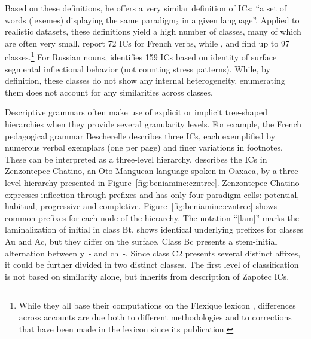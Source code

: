 \documentclass[output=paper]{langscibook}
\begin{document}
    Based on these definitions, he offers a very similar definition of ICs: ``a set of words (lexemes) displaying the same paradigm$_{2}$ in a given language''. Applied to realistic datasets, these definitions yield a high number of classes, many of which are often very small. \citet{StumpFinkel2013} report 72 ICs for French verbs, while \citet{Bonamihdr}, \citet{BeniamineBonamiSagot2017} and \citet{BeniaminePhd} find up to 97 classes.\footnote{While they all base their computations on the Flexique lexicon \citep{BonamiCaronPlancq2014}, differences across accounts are due both to different methodologies and to corrections that have been made in the lexicon since its publication.} For Russian nouns, \citet{BeniaminePhd} identifies 159 ICs based on identity of surface segmental inflectional behavior (not counting stress patterns). While, by definition, these classes do not show any internal heterogeneity, enumerating them does not account for any similarities across classes.
    
    Descriptive grammars often make use of explicit or implicit tree-shaped hierarchies when they provide several granularity levels. For example, the French pedagogical grammar Bescherelle \citep{bescherelle} describes three ICs, each exemplified by numerous verbal exemplars (one per page) and finer variations in footnotes. These can be interpreted as a three-level hierarchy. \citet{Campbell2011} describes the ICs in Zenzontepec Chatino, an Oto-Manguean language spoken in Oaxaca, by a three-level hierarchy presented in Figure~\ref{fig:beniamine:czntree}. Zenzontepec Chatino expresses inflection through prefixes and has only four paradigm cells: potential, habitual, progressive and completive. Figure~\ref{fig:beniamine:czntree} shows common prefixes for each node of the hierarchy. The notation ``[lam]'' marks the laminalization of initial \unitup{[t]} in class Bt. \citet{Campbell2011} shows identical underlying prefixes for classes Au and Ac, but they differ on the surface. Class Bc presents a stem-initial alternation between \unit{y-} and \unit{ch-}. Since class C2 presents several distinct affixes, it could be further divided in two distinct classes. The first level of  classification is not based on similarity alone, but inherits from  description of Zapotec ICs.
    
\end{document}
